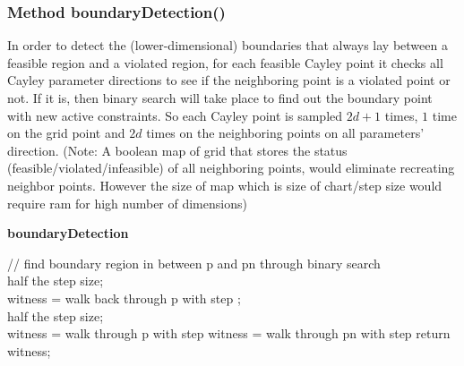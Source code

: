 \subsubsection{ Method \textsf{boundaryDetection()}}
\label{sec:boundaryDetection}


In order to detect the (lower-dimensional) boundaries that always lay
between a feasible region and a violated region, for each feasible
Cayley point it  checks all Cayley parameter directions to
see if the neighboring point is a violated point or not. If it is,
then binary search will take place to find out the boundary point with
new active constraints. So each Cayley point is sampled $2d+1$ times,
$1$ time on the grid point and $2d$ times on the neighboring points on
all parameters' direction. (Note: A boolean map of grid that stores
the status (feasible/violated/infeasible) of all neighboring points,
would eliminate recreating neighbor points. However the size of map
which is size of chart/step size would require ram for high number of
dimensions)\\

\begin{algorithm} [htbp]

  {\bf boundaryDetection}\\
  \BlankLine

	{
		{
			// find boundary region in between p and pn through binary search \\

			half the step size;\\
			witness = walk back through p with step ;\\

			{
				half the step size; 	\\
				{	witness = walk through p with step }
				{	witness = walk through pn with step }
			}
		}
	}
	return witness;\\

   \caption{ boundaryDetection
\label{alg:boundaryDetection}}
\end{algorithm}












